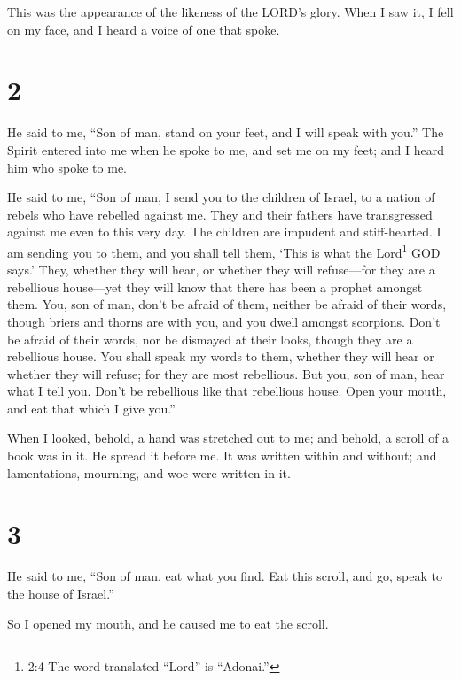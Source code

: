 This was the appearance of the likeness of the LORD's glory. When I saw
it, I fell on my face, and I heard a voice of one that spoke.

\hypertarget{section-1}{%
\section{2}\label{section-1}}

 He said to me, ``Son of man, stand on your feet, and I will
speak with you.''  The Spirit entered into me when he spoke
to me, and set me on my feet; and I heard him who spoke to me.

 He said to me, ``Son of man, I send you to the children of
Israel, to a nation of rebels who have rebelled against me. They and
their fathers have transgressed against me even to this very day.
 The children are impudent and stiff-hearted. I am sending
you to them, and you shall tell them, `This is what the Lord\footnote{2:4
  The word translated ``Lord'' is ``Adonai.''} GOD says.' 
They, whether they will hear, or whether they will refuse---for they are
a rebellious house---yet they will know that there has been a prophet
amongst them.  You, son of man, don't be afraid of them,
neither be afraid of their words, though briers and thorns are with you,
and you dwell amongst scorpions. Don't be afraid of their words, nor be
dismayed at their looks, though they are a rebellious house.
 You shall speak my words to them, whether they will hear or
whether they will refuse; for they are most rebellious.  But
you, son of man, hear what I tell you. Don't be rebellious like that
rebellious house. Open your mouth, and eat that which I give you.''

 When I looked, behold, a hand was stretched out to me; and
behold, a scroll of a book was in it.  He spread it before
me. It was written within and without; and lamentations, mourning, and
woe were written in it.

\hypertarget{section-2}{%
\section{3}\label{section-2}}

 He said to me, ``Son of man, eat what you find. Eat this
scroll, and go, speak to the house of Israel.''

 So I opened my mouth, and he caused me to eat the scroll.


